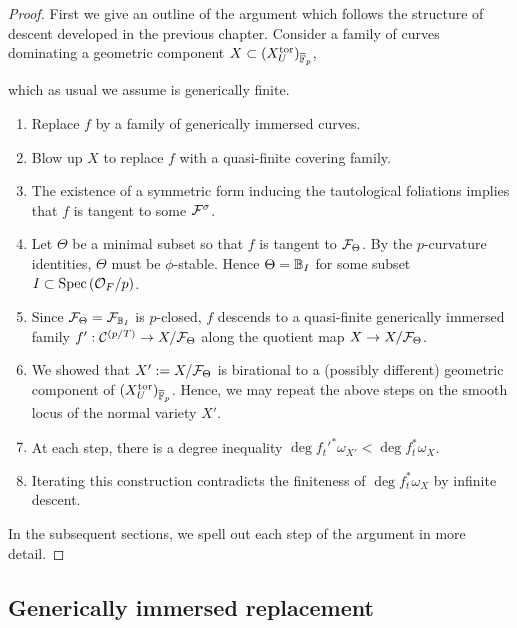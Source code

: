 \documentclass[main.tex]{subfiles}
\begin{document}
{\begin{proof}
First we give an outline of the argument which follows the structure of descent developed in the previous chapter. Consider a family of curves dominating a geometric component $X \subset (X_U^{\mathrm{tor}})_{\overline{\mathbb{F}}_p}$,
\begin{center}
\end{center}
which as usual we assume is generically finite. 
\begin{enumerate}
\item Replace $f$ by a family of generically immersed curves.
\item Blow up $X$ to replace $f$ with a quasi-finite covering family.
\item The existence of a symmetric form inducing the tautological foliations implies that $f$ is tangent to some $\mathcal{F}^{\sigma}$.
\item Let $\Theta$ be a minimal subset so that $f$ is tangent to $\mathcal{F}_{\Theta}$. By the $p$-curvature identities, $\Theta$ must be $\phi$-stable. Hence $\Theta = \mathbb{B}_I$ for some subset $I \subset \operatorname{\mathrm{Spec}}{(\mathcal{O}_F / p)}$.
\item Since $\mathcal{F}_{\Theta} = \mathcal{F}_{\mathbb{B}_I}$ is $p$-closed, $f$ descends to a quasi-finite generically immersed family $f' : \mathcal{C}^{(p/T)} \to X / \mathcal{F}_{\Theta}$ along the quotient map $X \to X / \mathcal{F}_{\Theta}$.
\item We showed that $X' := X / \mathcal{F}_{\Theta}$ is birational to a (possibly different) geometric component of $(X_U^{\mathrm{tor}})_{\overline{\mathbb{F}}_p}$. Hence, we may repeat the above steps on the smooth locus of the normal variety $X'$. 
\item At each step, there is a degree inequality $\deg{f_t'^* \omega_{X'}} < \deg{f_t^* \omega_X}$.
\item Iterating this construction contradicts the finiteness of $\deg{f_t^* \omega_X}$ by infinite descent.
\end{enumerate}
In the subsequent sections, we spell out each step of the argument in more detail.
\end{proof}

\subsection{Generically immersed replacement}

}
\end{document}
